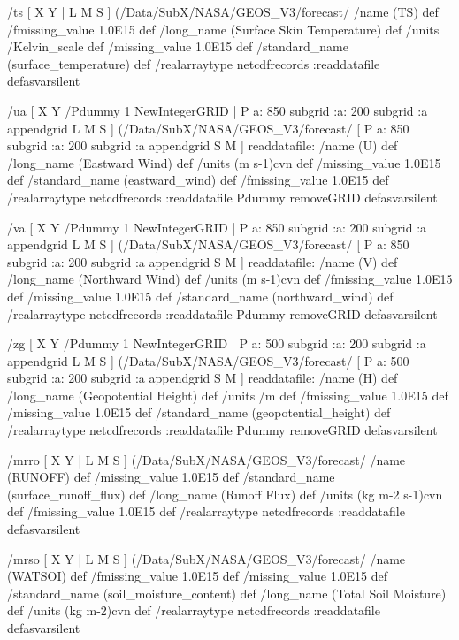 \begin{ingrid}
{ /ts{
[ X Y | L M S ] (/Data/SubX/NASA/GEOS_V3/forecast/%
/name (TS) def
 /fmissing_value 1.0E15 def
 /long_name (Surface Skin Temperature) def
 /units /Kelvin_scale def
 /missing_value 1.0E15 def
 /standard_name (surface_temperature) def
 /realarraytype netcdfrecords :readdatafile
}defasvarsilent

 /ua {
[ X Y /Pdummy 1 NewIntegerGRID | P a: 850 subgrid :a: 200 subgrid :a appendgrid L M S ]
(/Data/SubX/NASA/GEOS_V3/forecast/%
[ P a: 850 subgrid :a: 200 subgrid :a appendgrid S M ] readdatafile:
/name (U) def
 /long_name (Eastward Wind) def
 /units (m s-1)cvn def
 /missing_value 1.0E15 def
 /standard_name (eastward_wind) def
 /fmissing_value 1.0E15 def
 /realarraytype netcdfrecords :readdatafile
 Pdummy removeGRID
}defasvarsilent

 /va {
[ X Y /Pdummy 1 NewIntegerGRID | P a: 850 subgrid :a: 200 subgrid :a appendgrid L M S ]
(/Data/SubX/NASA/GEOS_V3/forecast/%
[ P a: 850 subgrid :a: 200 subgrid :a appendgrid S M ] readdatafile:
/name (V) def
 /long_name (Northward Wind) def
 /units (m s-1)cvn def
 /fmissing_value 1.0E15 def
 /missing_value 1.0E15 def
 /standard_name (northward_wind) def
 /realarraytype netcdfrecords :readdatafile
  Pdummy removeGRID
}defasvarsilent

 /zg {
[ X Y /Pdummy 1 NewIntegerGRID | P a: 500 subgrid :a: 200 subgrid :a appendgrid L M S ]
(/Data/SubX/NASA/GEOS_V3/forecast/%
[ P a: 500 subgrid :a: 200 subgrid :a appendgrid S M ] readdatafile:
/name (H) def
 /long_name (Geopotential Height) def
 /units /m def
 /fmissing_value 1.0E15 def
 /missing_value 1.0E15 def
 /standard_name (geopotential_height) def
 /realarraytype netcdfrecords :readdatafile
  Pdummy removeGRID
}defasvarsilent

 /mrro{
[ X Y | L M S ] (/Data/SubX/NASA/GEOS_V3/forecast/%
/name (RUNOFF) def
 /missing_value 1.0E15 def
 /standard_name (surface_runoff_flux) def
 /long_name (Runoff Flux) def
 /units (kg m-2 s-1)cvn def
 /fmissing_value 1.0E15 def
 /realarraytype netcdfrecords :readdatafile
}defasvarsilent

 /mrso{
[ X Y | L M S ] (/Data/SubX/NASA/GEOS_V3/forecast/%
/name (WATSOI) def
 /fmissing_value 1.0E15 def
 /missing_value 1.0E15 def
 /standard_name (soil_moisture_content) def
 /long_name (Total Soil Moisture) def
 /units (kg m-2)cvn def
 /realarraytype netcdfrecords :readdatafile
}defasvarsilent

}
\end{ingrid}

